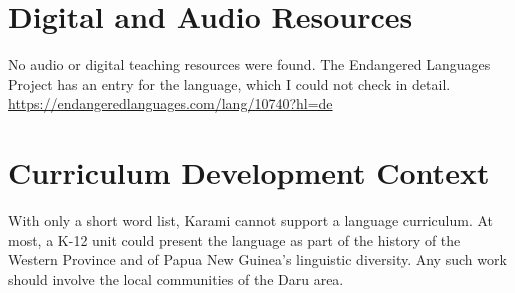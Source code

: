 \documentclass[12pt]{article}
\begin{document}
\section{Digital and Audio Resources}
No audio or digital teaching resources were found. The Endangered Languages Project has an entry for the language, which I could not check in detail. \url{https://endangeredlanguages.com/lang/10740?hl=de}

\section{Curriculum Development Context}
With only a short word list, Karami cannot support a language curriculum. At most, a K-12 unit could present the language as part of the history of the Western Province and of Papua New Guinea's linguistic diversity. Any such work should involve the local communities of the Daru area.
\end{document}
